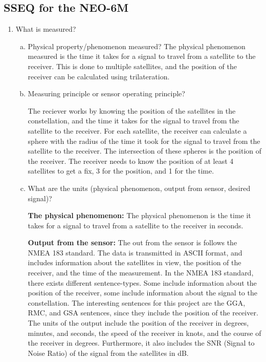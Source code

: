 \subsection{SSEQ for the NEO-6M}
\begin{enumerate}
    \item What is measured?
    \begin{enumerate}[(a)]
        \item Physical property/phenomenon measured?
        The physical phenomenon measured is the time it takes for a signal to travel from a satellite to the receiver.
        This is done to multiple satellites, and the position of the receiver can be calculated using trilateration.

        \item Measuring principle or sensor operating principle?

        The reciever works by knowing the position of the satellites in the constellation, and the time it takes for the signal to travel from the satellite to the receiver.
        For each satellite, the receiver can calculate a sphere with the radius of the time it took for the signal to travel from the satellite to the receiver.
        The intersection of these spheres is the position of the receiver.
        The receiver needs to know the position of at least 4 satellites to get a fix, 3 for the position, and 1 for the time.


        \item What are the units (physical phenomenon, output from sensor, desired signal)?

        \textbf{The physical phenomenon:}
        The physical phenomenon is the time it takes for a signal to travel from a satellite to the receiver in seconds.

        \textbf{Output from the sensor:}
        The out from the sensor is follows the NMEA 183 standard.
        The data is transmitted in ASCII format, and includes information about the satellites in view, the position of the receiver, and the time of the measurement.
        In the NMEA 183 standard, there exists different sentence-types.
        Some include information about the position of the receiver, some include information about the signal to the constellation.
        The interesting sentences for this project are the GGA, RMC, and GSA sentences, since they include the position of the receiver. %
        The units of the output include the position of the receiver in degrees, minutes, and seconds, the speed of the receiver in knots, and the course of the receiver in degrees.
        Furthermore, it also includes the SNR (Signal to Noise Ratio) of the signal from the satellites in dB.



\end{enumerate}
\end{enumerate}
